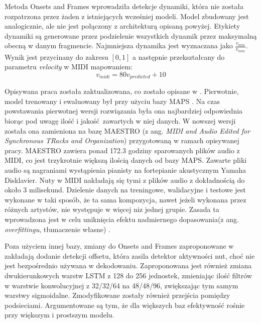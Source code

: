 \documentclass[12pt,a4paper,twoside]{mwart}
\begin{document}
Metoda Onsets and Frames wprowadziła detekcje dynamiki, która nie została rozpatrzona przez żaden z istniejących wcześniej modeli. Model zbudowany jest analogicznie, ale nie jest połączony z architekturą opisaną powyżej. Etykiety dynamiki są generowane przez podzielenie wszystkich dynamik przez maksymalną obecną w danym fragmencie. Najmniejsza dynamika jest wyznaczana jako $\frac{v_{min}}{v_{max}}$. Wynik jest przycinany do zakresu $\left[0,1\right]$ a następnie przekształcany do parametru \textit{velocity} w MIDI mapowaniem:
\begin{equation}
  v_{midi} = 80 v_{predicted} + 10
\end{equation}

Opisywana praca została zaktualizowana, co zostało opisane w \cite[3-6]{Transcription:Cheng:OnsetsAndFramesNovelization}. Pierwotnie, model trenowany i ewaluowany był przy użyciu bazy MAPS \cite{Transcription:OnsetsAndFrames:MAPS}. Na czas powstawania pierwotnej wersji rozwiązania była ona najbardziej odpowiednia biorąc pod uwagę ilość i jakość zawartych w niej danych. W nowszej wersji została ona zamieniona na bazę MAESTRO (z ang. \textit{MIDI and Audio Edited for Synchronous TRacks and Organization}) przygotowaną w ramach opisywanej pracy. MAESTRO zawiera ponad 172.3 godziny sparowanych plików audio z MIDI, co jest trzykrotnie większą ilością danych od bazy MAPS. Zawarte pliki audio są nagraniami wystąpienia pianisty na fortepianie akustycznym Yamaha Disklavier. Nuty w MIDI nakładają się tymi z plików audio z dokładnością do około 3 milisekund. Dzielenie danych na treningowe, walidacyjne i testowe jest wykonane w taki sposób, że ta sama kompozycja, nawet jeżeli wykonana przez różnych artystów, nie występuje w więcej niz jednej grupie. Zasada ta wprowadzona jest w celu uniknięcia efektu nadmiernego dopasowania(z ang. \textit{overfittingu}, tłumaczenie własne) \cite{Transcription:Curtis:MAESTRO}.

Poza użyciem innej bazy, zmiany do Onsets and Frames zaproponowane w \cite[3-6]{Transcription:Cheng:OnsetsAndFramesNovelization} zakładają dodanie detekcji offsetu, która zasila detektor aktywności nut, choć nie jest bezpośrednio używana w dekodowaniu. Zaproponowana jest również zmiana dwukierunkowych warstw LSTM z 128 do 256 jednostek, zmieniając ilość filtrów w warstwie konwolucyjnej z 32/32/64 na 48/48/96, zwiększając tym samym warstwy sigmoidalne. Zmodyfikowane zostały również przejścia pomiędzy podsieciami. Argumentowane są tym, że dla większych baz efektywność rośnie przy większym i prostszym modelu. 
\end{document}
